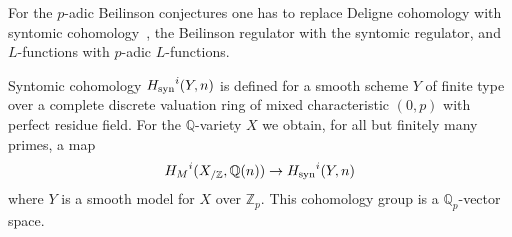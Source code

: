 \documentclass{amsart}
\begin{document}
For the {$p$-adic{\futurelet{}}} Beilinson conjectures one has
to replace Deligne cohomology with syntomic cohomology~\cite{Gro94,Niz97,Bes98a}, 
the Beilinson regulator with the syntomic regulator, and {$L$-functions{\futurelet{}}} with {$p$-adic{\futurelet{}}}
{$L$-functions{\futurelet{}}}.

Syntomic cohomology ${H_{\textup{syn}}}^i(Y,n)$ is defined for a smooth
scheme $ Y $ of finite type over a complete discrete valuation ring of mixed
characteristic $(0,p)$ with perfect residue field.
For the ${\mathbb Q}$-variety $X$ we obtain, for all but finitely many primes, a map
\begin{equation}\label{regpmap}
 {H_M}^i(X_{/{\mathbb Z}},{\mathbb Q}(n)) \to {H_{\textup{syn}}}^i(Y,n)
\end{equation}
where $Y$ is a smooth model for $X$ over ${\mathbb Z}_p$. This cohomology group is a
${{\mathbb Q_p}}$-vector space.
\end{document}
